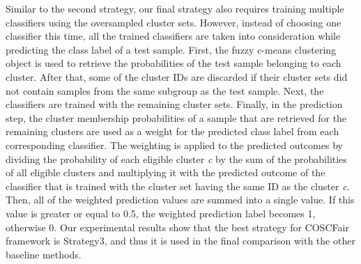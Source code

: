  Similar to the second strategy, our final strategy also requires training multiple classifiers using the oversampled cluster sets. However, instead of choosing one classifier this time, all the trained classifiers are taken into consideration while predicting the class label of a test sample. First, the fuzzy c-means clustering object is used to retrieve the probabilities of the test sample belonging to each cluster. After that, some of the cluster IDs are discarded if their cluster sets did not contain samples from the same subgroup as the test sample. Next, the classifiers are trained with the remaining cluster sets. Finally, in the prediction step, the cluster membership probabilities of a sample that are retrieved for the remaining clusters are used as a weight for the predicted class label from each corresponding classifier. The weighting is applied to the predicted outcomes by dividing the probability of each eligible cluster \textit{c} by the sum of the probabilities of all eligible clusters and multiplying it with the predicted outcome of the classifier that is trained with the cluster set having the same ID as the cluster \textit{c}. Then, all of the weighted prediction values are summed into a single value. If this value is greater or equal to 0.5, the weighted prediction label becomes 1, otherwise 0. Our experimental results show that the best strategy for COSCFair framework is Strategy3, and thus it is used in the final comparison with the other baseline methods.



